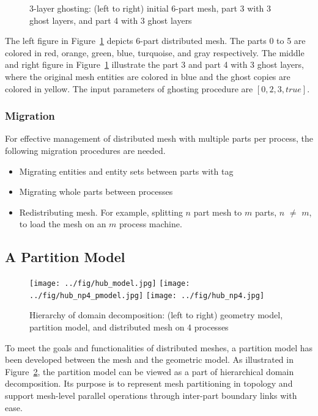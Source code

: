 \begin{figure}
\caption{3-layer ghosting: (left to right) initial 6-part mesh, part 3 with 3 ghost layers, and part 4 with 3 ghost layers}
\label{xgc}  %
\end{figure}

The left figure in Figure~\ref{xgc} depicts 6-part distributed mesh. The parts 0 to 5 are colored in red, orange, green, blue, turquoise, and gray respectively. The middle and right figure in Figure~\ref{xgc} illustrate the part 3 and part 4 with 3 ghost layers, where the original mesh entities are colored in blue and the ghost copies are colored in yellow. The input parameters of ghosting procedure are $[0, 2, 3, true]$.

\subsubsection{Migration} 

For effective management of distributed mesh with multiple parts per process, the following migration procedures are needed.

\begin{itemize}
\item Migrating entities and entity sets between parts with tag
\item Migrating whole parts between processes
\item Redistributing mesh. For example, splitting $n$ part mesh to $m$ parts, $n$ $\neq$ $m$, to load the mesh on an $m$ process machine.
\end{itemize}

\subsection{A Partition Model}\label{pmodel}

\begin{figure}
\centering
\texttt{[image: ../fig/hub\_model.jpg]}
\texttt{[image: ../fig/hub\_np4\_pmodel.jpg]}
\texttt{[image: ../fig/hub\_np4.jpg]}
\caption[Hierarchy of domain decomposition]{Hierarchy of domain decomposition: (left to right) geometry model, partition model, and distributed mesh on 4 processes}
\label{torus}
\end{figure}

To meet the goals and functionalities of distributed meshes, a partition model has been
developed between the mesh and the geometric model. As illustrated in
Figure~\ref{torus}, the partition model can be
viewed as a part of hierarchical domain 
decomposition. Its purpose is to represent mesh
partitioning in topology and support mesh-level parallel 
operations through inter-part boundary links with ease. 

